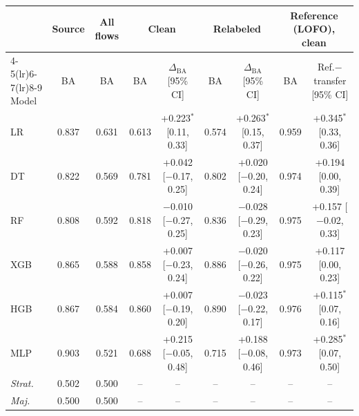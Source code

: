 \begin{tabular}{lcccccccc}
\toprule
 & Source & All flows & \multicolumn{2}{c}{Clean} & \multicolumn{2}{c}{Relabeled} & \multicolumn{2}{c}{Reference (LOFO), clean} \\
\cmidrule(lr){4-5}\cmidrule(lr){6-7}\cmidrule(lr){8-9}
Model & BA & BA & BA & $\Delta_{\mathrm{BA}}$ [95\% CI] & BA & $\Delta_{\mathrm{BA}}$ [95\% CI] & BA & Ref.$-$transfer [95\% CI] \\
\midrule
LR & 0.837 & 0.631 & 0.613 & +0.223$^{\ast}$ [0.11, 0.33] & 0.574 & +0.263$^{\ast}$ [0.15, 0.37] & 0.959 & +0.345$^{\ast}$ [0.33, 0.36] \\
DT & 0.822 & 0.569 & 0.781 & +0.042 [$-$0.17, 0.25] & 0.802 & +0.020 [$-$0.20, 0.24] & 0.974 & +0.194 [0.00, 0.39] \\
RF & 0.808 & 0.592 & 0.818 & $-$0.010 [$-$0.27, 0.25] & 0.836 & $-$0.028 [$-$0.29, 0.23] & 0.975 & +0.157 [$-$0.02, 0.33] \\
XGB & 0.865 & 0.588 & 0.858 & +0.007 [$-$0.23, 0.24] & 0.886 & $-$0.020 [$-$0.26, 0.22] & 0.975 & +0.117 [0.00, 0.23] \\
HGB & 0.867 & 0.584 & 0.860 & +0.007 [$-$0.19, 0.20] & 0.890 & $-$0.023 [$-$0.22, 0.17] & 0.976 & +0.115$^{\ast}$ [0.07, 0.16] \\
MLP & 0.903 & 0.521 & 0.688 & +0.215 [$-$0.05, 0.48] & 0.715 & +0.188 [$-$0.08, 0.46] & 0.973 & +0.285$^{\ast}$ [0.07, 0.50] \\
\textit{Strat.} & 0.502 & 0.500 & -- & -- & -- & -- & -- & -- \\
\textit{Maj.} & 0.500 & 0.500 & -- & -- & -- & -- & -- & -- \\
\bottomrule
\end{tabular}
